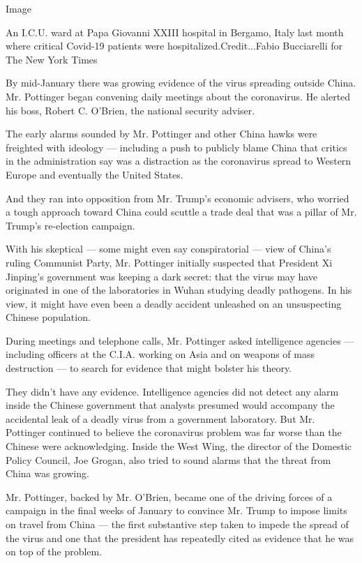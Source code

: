 Image

An I.C.U. ward at Papa Giovanni XXIII hospital in Bergamo, Italy last
month where critical Covid-19 patients were hospitalized.Credit...Fabio
Bucciarelli for The New York Times

By mid-January there was growing evidence of the virus spreading outside
China. Mr. Pottinger began convening daily meetings about the
coronavirus. He alerted his boss, Robert C. O'Brien, the national
security adviser.

The early alarms sounded by Mr. Pottinger and other China hawks were
freighted with ideology --- including a push to publicly blame China
that critics in the administration say was a distraction as the
coronavirus spread to Western Europe and eventually the United States.

And they ran into opposition from Mr. Trump's economic advisers, who
worried a tough approach toward China could scuttle a trade deal that
was a pillar of Mr. Trump's re-election campaign.

With his skeptical --- some might even say conspiratorial --- view of
China's ruling Communist Party, Mr. Pottinger initially suspected that
President Xi Jinping's government was keeping a dark secret: that the
virus may have originated in one of the laboratories in Wuhan studying
deadly pathogens. In his view, it might have even been a deadly accident
unleashed on an unsuspecting Chinese population.

During meetings and telephone calls, Mr. Pottinger asked intelligence
agencies --- including officers at the C.I.A. working on Asia and on
weapons of mass destruction --- to search for evidence that might
bolster his theory.

They didn't have any evidence. Intelligence agencies did not detect any
alarm inside the Chinese government that analysts presumed would
accompany the accidental leak of a deadly virus from a government
laboratory. But Mr. Pottinger continued to believe the coronavirus
problem was far worse than the Chinese were acknowledging. Inside the
West Wing, the director of the Domestic Policy Council, Joe Grogan, also
tried to sound alarms that the threat from China was growing.

Mr. Pottinger, backed by Mr. O'Brien, became one of the driving forces
of a campaign in the final weeks of January to convince Mr. Trump to
impose limits on travel from China --- the first substantive step taken
to impede the spread of the virus and one that the president has
repeatedly cited as evidence that he was on top of the problem.

